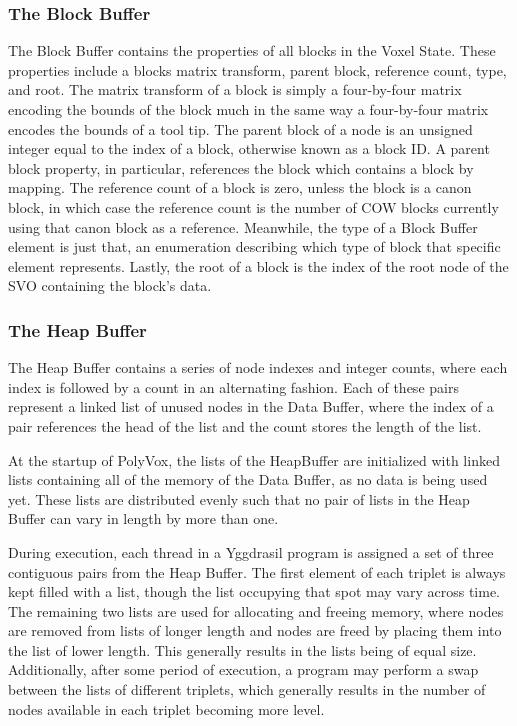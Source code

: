 \documentclass[onecolumn, draftclsnofoot,10pt, compsoc]{IEEEtran}
\begin{document}
\subsubsection{The Block Buffer}

The Block Buffer contains the properties of all blocks in the Voxel State. These properties include a blocks matrix transform, parent block, reference count, type, and root. The matrix transform of a block is simply a four-by-four matrix encoding the bounds of the block much in the same way a four-by-four matrix encodes the bounds of a tool tip. The parent block of a node is an unsigned integer equal to the index of a block, otherwise known as a block ID. A parent block property, in particular, references the block which contains a block by mapping. The reference count of a block is zero, unless the block is a canon block, in which case the reference count is the number of COW blocks currently using that canon block as a reference. Meanwhile, the type of a Block Buffer element is just that, an enumeration describing which type of block that specific element represents. Lastly, the root of a block is the index of the root node of the SVO containing the block's data.


\subsubsection{The Heap Buffer}

The Heap Buffer contains a series of node indexes and integer counts, where each index is followed by a count in an alternating fashion. Each of these pairs represent a linked list of unused nodes in the Data Buffer, where the index of a pair references the head of the list and the count stores the length of the list.

At the startup of PolyVox, the lists of the HeapBuffer are initialized with linked lists containing all of the memory of the Data Buffer, as no data is being used yet. These lists are distributed evenly such that no pair of lists in the Heap Buffer can vary in length by more than one.

During execution, each thread in a Yggdrasil program is assigned a set of three contiguous pairs from the Heap Buffer. The first element of each triplet is always kept filled with a list, though the list occupying that spot may vary across time. The remaining two lists are used for allocating and freeing memory, where nodes are removed from lists of longer length and nodes are freed by placing them into the list of lower length. This generally results in the lists being of equal size. Additionally, after some period of execution, a program may perform a swap between the lists of different triplets, which generally results in the number of nodes available in each triplet becoming more level.
\end{document}
